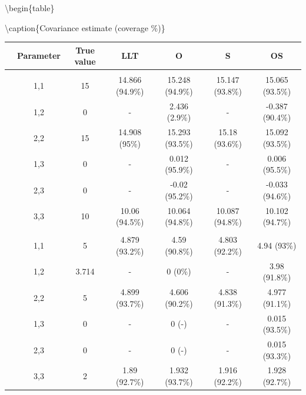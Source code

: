 \documentclass[
]{article}
\begin{document}
\textbackslash begin\{table\}

\textbackslash caption\{\label{tab:unnamed-chunk-15}Covariance estimate (coverage \%)\}
\centering

\begin{tabular}[t]{ccccccc}
\toprule
 & Parameter & True value & LLT & O & S & OS\\
\midrule
\addlinespace[0.3em]
\multicolumn{7}{l}{\textbf{Observation Error}}\\
\hspace{1em} & 1,1 & 15 & 14.866 (94.9\%) & 15.248 (94.9\%) & 15.147 (93.8\%) & 15.065 (93.5\%)\\
\cmidrule{2-7}
\hspace{1em} & 1,2 & 0 & - & 2.436 (2.9\%) & - & -0.387 (90.4\%)\\
\cmidrule{2-7}
\hspace{1em} & 2,2 & 15 & 14.908 (95\%) & 15.293 (93.5\%) & 15.18 (93.6\%) & 15.092 (93.5\%)\\
\cmidrule{2-7}
\hspace{1em} & 1,3 & 0 & - & 0.012 (95.9\%) & - & 0.006 (95.5\%)\\
\cmidrule{2-7}
\hspace{1em} & 2,3 & 0 & - & -0.02 (95.2\%) & - & -0.033 (94.6\%)\\
\cmidrule{2-7}
\hspace{1em} & 3,3 & 10 & 10.06 (94.5\%) & 10.064 (94.8\%) & 10.087 (94.8\%) & 10.102 (94.7\%)\\
\cmidrule{1-7}
\addlinespace[0.3em]
\multicolumn{7}{l}{\textbf{State Process}}\\
\hspace{1em} & 1,1 & 5 & 4.879 (93.2\%) & 4.59 (90.8\%) & 4.803 (92.2\%) & 4.94 (93\%)\\
\cmidrule{2-7}
\hspace{1em} & 1,2 & 3.714 & - & 0 (0\%) & - & 3.98 (91.8\%)\\
\cmidrule{2-7}
\hspace{1em} & 2,2 & 5 & 4.899 (93.7\%) & 4.606 (90.2\%) & 4.838 (91.3\%) & 4.977 (91.1\%)\\
\cmidrule{2-7}
\hspace{1em} & 1,3 & 0 & - & 0 (-) & - & 0.015 (93.5\%)\\
\cmidrule{2-7}
\hspace{1em} & 2,3 & 0 & - & 0 (-) & - & 0.015 (93.3\%)\\
\cmidrule{2-7}
\hspace{1em} & 3,3 & 2 & 1.89 (92.7\%) & 1.932 (93.7\%) & 1.916 (92.2\%) & 1.928 (92.7\%)\\
\bottomrule
\end{tabular}
\end{document}
